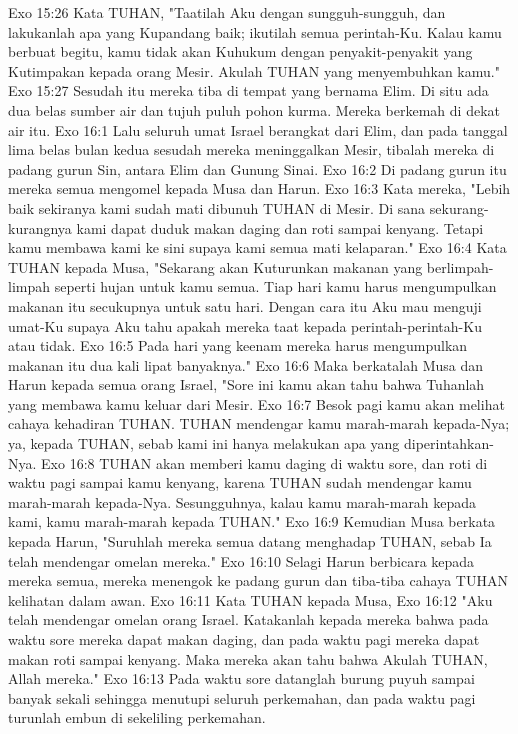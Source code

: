Exo 15:26  Kata TUHAN, "Taatilah Aku dengan sungguh-sungguh, dan lakukanlah apa yang Kupandang baik; ikutilah semua perintah-Ku. Kalau kamu berbuat begitu, kamu tidak akan Kuhukum dengan penyakit-penyakit yang Kutimpakan kepada orang Mesir. Akulah TUHAN yang menyembuhkan kamu."
Exo 15:27  Sesudah itu mereka tiba di tempat yang bernama Elim. Di situ ada dua belas sumber air dan tujuh puluh pohon kurma. Mereka berkemah di dekat air itu.
Exo 16:1  Lalu seluruh umat Israel berangkat dari Elim, dan pada tanggal lima belas bulan kedua sesudah mereka meninggalkan Mesir, tibalah mereka di padang gurun Sin, antara Elim dan Gunung Sinai.
Exo 16:2  Di padang gurun itu mereka semua mengomel kepada Musa dan Harun.
Exo 16:3  Kata mereka, "Lebih baik sekiranya kami sudah mati dibunuh TUHAN di Mesir. Di sana sekurang-kurangnya kami dapat duduk makan daging dan roti sampai kenyang. Tetapi kamu membawa kami ke sini supaya kami semua mati kelaparan."
Exo 16:4  Kata TUHAN kepada Musa, "Sekarang akan Kuturunkan makanan yang berlimpah-limpah seperti hujan untuk kamu semua. Tiap hari kamu harus mengumpulkan makanan itu secukupnya untuk satu hari. Dengan cara itu Aku mau menguji umat-Ku supaya Aku tahu apakah mereka taat kepada perintah-perintah-Ku atau tidak.
Exo 16:5  Pada hari yang keenam mereka harus mengumpulkan makanan itu dua kali lipat banyaknya."
Exo 16:6  Maka berkatalah Musa dan Harun kepada semua orang Israel, "Sore ini kamu akan tahu bahwa Tuhanlah yang membawa kamu keluar dari Mesir.
Exo 16:7  Besok pagi kamu akan melihat cahaya kehadiran TUHAN. TUHAN mendengar kamu marah-marah kepada-Nya; ya, kepada TUHAN, sebab kami ini hanya melakukan apa yang diperintahkan-Nya.
Exo 16:8  TUHAN akan memberi kamu daging di waktu sore, dan roti di waktu pagi sampai kamu kenyang, karena TUHAN sudah mendengar kamu marah-marah kepada-Nya. Sesungguhnya, kalau kamu marah-marah kepada kami, kamu marah-marah kepada TUHAN."
Exo 16:9  Kemudian Musa berkata kepada Harun, "Suruhlah mereka semua datang menghadap TUHAN, sebab Ia telah mendengar omelan mereka."
Exo 16:10  Selagi Harun berbicara kepada mereka semua, mereka menengok ke padang gurun dan tiba-tiba cahaya TUHAN kelihatan dalam awan.
Exo 16:11  Kata TUHAN kepada Musa,
Exo 16:12  "Aku telah mendengar omelan orang Israel. Katakanlah kepada mereka bahwa pada waktu sore mereka dapat makan daging, dan pada waktu pagi mereka dapat makan roti sampai kenyang. Maka mereka akan tahu bahwa Akulah TUHAN, Allah mereka."
Exo 16:13  Pada waktu sore datanglah burung puyuh sampai banyak sekali sehingga menutupi seluruh perkemahan, dan pada waktu pagi turunlah embun di sekeliling perkemahan.
